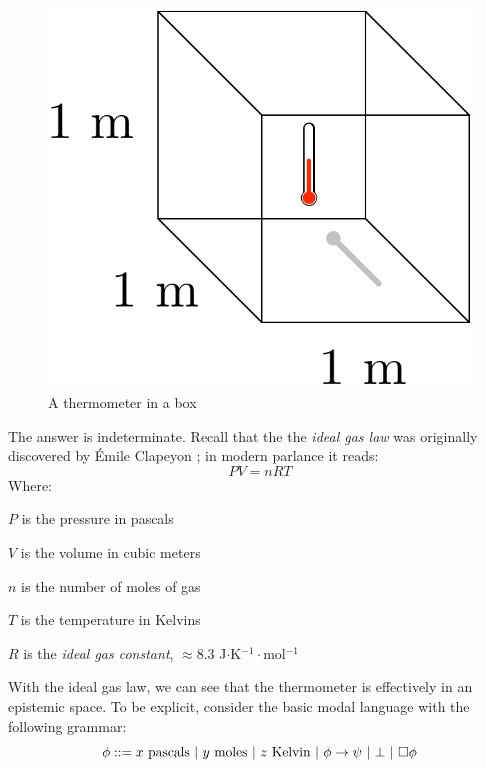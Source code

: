 \documentclass[11pt]{article}
\numberwithin{equation}{subsection}
\begin{document}
\begin{figure}[ht]
\begin{center}
\includegraphics[scale=.5]{thermometer.pdf}
\end{center}
\caption{A thermometer in a box}
\label{fig:therm1}
\end{figure}

The answer is indeterminate.  Recall that the the \emph{ideal gas law} was originally discovered by \'{E}mile Clapeyon \citep{clapeyron_mmoire_1834}; in modern parlance it reads:
\[ P V = n R T\]
Where:
\begin{bul}
\item $P$ is the pressure in pascals
\item $V$ is the volume in cubic meters
\item $n$ is the number of moles of gas
\item $T$ is the temperature in Kelvins
\item $R$ is the \emph{ideal gas constant}, $\approx8.3$ J$\cdot$K$^{-1}\cdot$mol$^{-1}$
\end{bul}

With the ideal gas law, we can see that the thermometer is effectively in an epistemic space.  To be explicit, consider the basic modal language with the following grammar:
\[ \phi ::= x \textup{ pascals}  \ |\ y \textup{ moles}  \ |\ z \textup{ Kelvin}  \ |\ \phi \to \psi \ |\ \bot \ |\ \Box \phi \]
\end{document}
